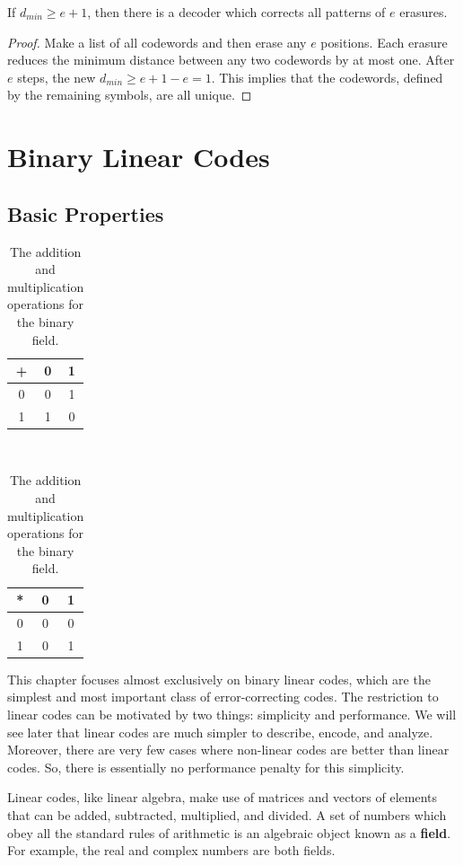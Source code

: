 \begin{proposition}
If $d_{min}\geq e+1$, then there is a decoder which corrects all patterns of $e$ erasures.
\end{proposition}
\begin{proof}
Make a list of all codewords and then erase any $e$ positions.
Each erasure reduces the minimum distance between any two codewords by at most one.
After $e$ steps, the new $d_{min}\geq e+1-e=1$.
This implies that the codewords, defined by the remaining symbols, are all unique.
\end{proof}

\section{Binary Linear Codes}


\subsection{Basic Properties}

\begin{table}
\begin{center}
\begin{tabular}{c||c|c}
+ & 0 & 1\tabularnewline
\hline
\hline
0 & 0 & 1\tabularnewline
\hline 
1 & 1 & 0\tabularnewline
\end{tabular}~~~\begin{tabular}{c||c|c}
{*} & 0 & 1\tabularnewline
\hline
\hline
0 & 0 & 0\tabularnewline
\hline 
1 & 0 & 1\tabularnewline
\end{tabular}
\caption{The addition and multiplication operations for the binary field.}
\label{tab:BinaryField}
\end{center}
\end{table}

This chapter focuses almost exclusively on binary linear codes, which are the simplest and most important class of error-correcting codes.
The restriction to linear codes can be motivated by two things: simplicity and performance.
We will see later that linear codes are much simpler to describe, encode, and analyze.
Moreover, there are very few cases where non-linear codes are better than linear codes.
So, there is essentially no performance penalty for this simplicity.

Linear codes, like linear algebra, make use of matrices and vectors of elements that can be added, subtracted, multiplied, and divided.
A set of numbers which obey all the standard rules of arithmetic is an algebraic object known as a \textbf{field}.
For example, the real and complex numbers are both fields.

